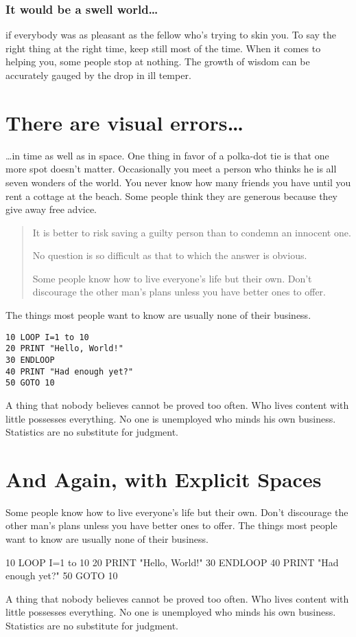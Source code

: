 \subsubsection{It would be a swell world\ldots}
if everybody was as pleasant as the fellow who's trying to skin
you.  To say the right thing at the right time, keep still most of the
time.  When it comes to helping you, some people stop at nothing.  The
growth of wisdom can be accurately gauged by the drop in ill temper.

\section{There are visual errors\ldots}
\ldots in time as well as in space.  One thing in favor of a polka-dot
tie is that one more spot doesn't matter.  Occasionally you meet a
person who thinks he is all seven wonders of the world.  You never
know how many friends you have until you rent a cottage at the beach.
Some people think they are generous because they give away free
advice.
\begin{quote}
It is better to risk saving a guilty person than to condemn
an innocent one.

No question is so difficult as that to which the
answer is obvious.

Some people know how to live everyone's life but
their own.  Don't discourage the other man's plans unless you have
better ones to offer.
\end{quote}

The things most people want to know are usually
none of their business.
\begin{verbatim}
10 LOOP I=1 to 10
20 PRINT "Hello, World!"
30 ENDLOOP
40 PRINT "Had enough yet?"
50 GOTO 10
\end{verbatim}
A thing that nobody believes cannot be proved
too often.  Who lives content with little possesses everything.  No
one is unemployed who minds his own business.  Statistics are no
substitute for judgment.

\section{And Again, with Explicit Spaces}
Some people know how to live everyone's life but
their own.  Don't discourage the other man's plans unless you have
better ones to offer.  The things most people want to know are usually
none of their business.
\begin{verbatim*}
  10 LOOP I=1 to 10
  20 PRINT "Hello, World!"
  30 ENDLOOP
  40 PRINT "Had enough yet?"
  50 GOTO 10
\end{verbatim*}
A thing that nobody believes cannot be proved
too often.  Who lives content with little possesses everything.  No
one is unemployed who minds his own business.  Statistics are no
substitute for judgment.

